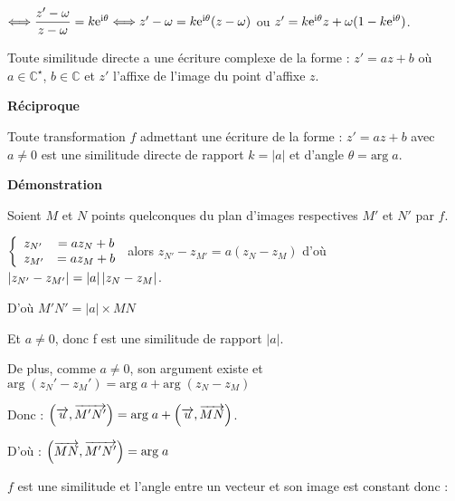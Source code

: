 \medskip
$ \Longleftrightarrow \dfrac{z'-\omega}{z-\omega}=k\mathrm{e}^{\text{i} \theta}\Longleftrightarrow   z'-\omega =k\mathrm{e}^{\text{i} \theta}(z-\omega)$   ou  $ z'=k\mathrm{e}^{\text{i} \theta}z +\omega(1-k\mathrm{e}^{\text{i} \theta}) $.

 \begin{corollary}
Toute similitude directe a une écriture complexe de la forme :\; $ z'=az+b $\; où $ a\in\mathbb{C}^{\star} $, $ b\in\mathbb{C} $  et $ z' $ l'affixe de l'image du point d'affixe $ z $.
 \end{corollary}
 
\medskip

\textbf{Réciproque}

\medskip

Toute transformation $f$ admettant une écriture de la forme : $z' = a z + b $  avec  $ a\neq 0 $ 
est une similitude directe de rapport  $ k = |a| $  et d'angle  $ \theta= \text{arg}\; a $.

 \medskip

\textbf{Démonstration}

\medskip
Soient $ M $ et $ N $ points quelconques du plan d'images respectives $ M' $ et $ N' $ par $f$.

\medskip
$  \left\{\begin{array}{l c l}
z_{N'}&=a z_{N}+b \\ 	 
z_{M'} &= a z_{M}+b\\

\end{array}\right.  $ alors $ z_{N'}-z_{M'}=a ( z_{N}-z_{M}) $ d'où $\abs{ z_{N'}-z_{M'}}=|a| \abs{ z_{N}-z_{M} }$.
\medskip

 D'où $ M'N'=|a|\times MN $
 
 \medskip
 
 Et  $a \neq 0 $, donc f est une similitude de rapport $ |a| $.
 
 \medskip
 
 De plus, comme $a \neq 0 $, son argument existe et $\text{arg}\; (z_N' - z_M') = \text{arg}\; a + \text{arg}\;(z_N -z_M)$

\medskip

Donc : $ \left(\overrightarrow{u}, \overrightarrow{M'N'}\right) =\text{arg}\; a+\left(\overrightarrow{u}, \overrightarrow{MN}\right)$.


\medskip

D’où : $ \left(\overrightarrow{MN}, \overrightarrow{M'N'}\right) =\text{arg}\; a$

\medskip

$f$ est une similitude et l'angle entre un vecteur et son image est constant donc :

